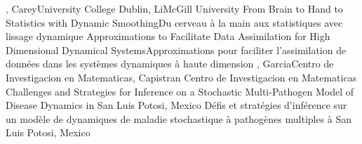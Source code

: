 
{
,  {Carey}{University College Dublin},  {Li}{McGill University}
}
{From Brain to Hand to Statistics with Dynamic Smoothing}{Du cerveau à la main aux statistiques avec lissage dynamique }
{\bubbleE \enspace \screenE}
{
}
{Approximations to Facilitate Data Assimilation for High Dimensional Dynamical Systems}{Approximations pour faciliter l’assimilation de données dans les systèmes dynamiques à haute dimension}
{\bubbleE \enspace \screenE}
{
,  {Garcia}{Centro de Investigacion en Matematicas},  {Capistran}
{Centro de Investigacion en Matematicas}
}
{Challenges and Strategies for Inference on a Stochastic Multi-Pathogen Model of Disease Dynamics in San Luis Potosi, Mexico }{Défis et stratégies d’inférence sur un modèle de dynamiques de maladie stochastique à pathogènes multiples à San Luis Potosi, Mexico}
{\bubbleE \enspace \screenE}


